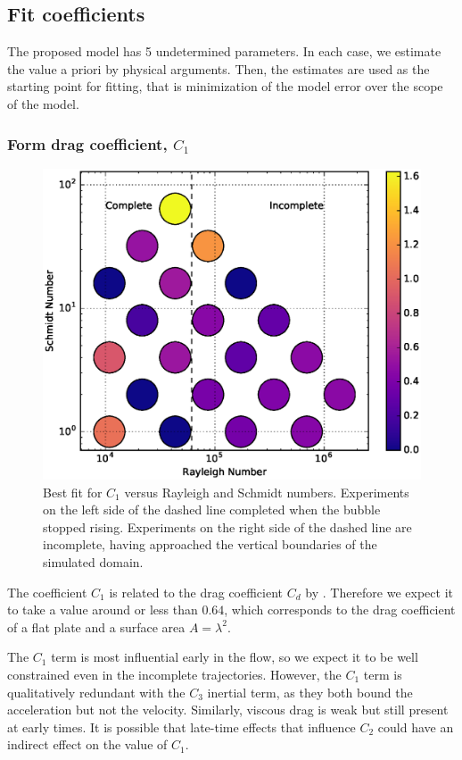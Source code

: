 \subsection{Fit coefficients}
The proposed model has 5 undetermined parameters.
In each case, we estimate the value a priori by physical arguments.
Then, the estimates are used as the starting point for fitting, that is minimization of the model error over the scope of the model.

\subsubsection{Form drag coefficient, $C_1$}

\begin{figure}
\includegraphics[width=\columnwidth]{figs/C1-vs-Rayleigh-Schmidt}
\caption{ 
  Best fit for $C_1$ versus Rayleigh and Schmidt numbers.
  Experiments on the left side of the dashed line completed when the bubble stopped rising.
  Experiments on the right side of the dashed line are incomplete, having approached the vertical boundaries of the simulated domain.
}
\end{figure}

The coefficient $C_1$ is related to the drag coefficient $C_d$ by .
Therefore we expect it to take a value around or less than $0.64$, which corresponds to the drag coefficient of a flat plate and a surface area $A = \lambda^2$.

The $C_1$ term is most influential early in the flow, so we expect it to be well constrained even in the incomplete trajectories.
However, the $C_1$ term is qualitatively redundant with the $C_3$ inertial term, as they both bound the acceleration but not the velocity.
Similarly, viscous drag is weak but still present at early times.
It is possible that late-time effects that influence $C_2$ could have an indirect effect on the value of $C_1$.


